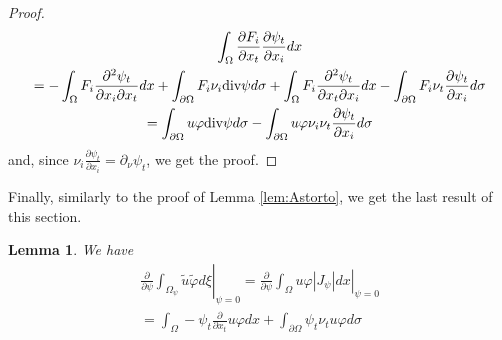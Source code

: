 \documentclass[a4paper,reqno,11pt,oneside]{amsart}
\theoremstyle{plain}
\theoremstyle{plain}
\newtheorem{lem}[thm]{Lemma}
\theoremstyle{plain}
\theoremstyle{remark}
\newtheorem{rem}[thm]{Remark}
\def\div{\textup{div}}
\begin{document}
\begin{proof}
\begin{multline}
        \int_\Omega \frac{\partial  F_i }{\partial x_t}\frac{\partial \psi_t}{\partial x_i}dx\\
        =
        -\int_\Omega F_i   \frac{\partial^2 \psi_t}{\partial x_i\partial x_t}dx
        +\int_{\partial\Omega} F_i\nu_i \div \psi d\sigma
        +\int_\Omega  F_i \frac{\partial^2 \psi_t}{ \partial x_t\partial x_i}dx
      -  \int_{\partial \Omega } F_i \nu_t\frac{\partial \psi_t}{\partial x_i}d\sigma\\
      =\int_{\partial\Omega} u\varphi \div \psi d\sigma
      -  \int_{\partial \Omega } u\varphi \nu_i \nu_t\frac{\partial \psi_t}{\partial x_i}d\sigma
\end{multline}
and, since $\nu_i \frac{\partial \psi_t}{\partial x_i}=\partial_\nu \psi_t$, we get the proof.

\end{proof} 
Finally, similarly to the proof of Lemma \ref{lem:Astorto}, we get the last result of this section. 
\begin{lem}\label{lem:uv}
 We have 
\begin{multline*}
\left. \frac{\partial}{\partial \psi}\int_{ \Omega_\psi} \tilde u\tilde \varphi d\xi\right|_{\psi=0}=
\left. \frac{\partial}{\partial \psi}\int_{ \Omega} u\varphi |J_\psi|dx\right|_{\psi=0}
\\=\int_\Omega-\psi_t \frac{\partial}{\partial x_t}  u \varphi  dx
+\int_{\partial\Omega}\psi_t \nu_t  u \varphi d\sigma
 \end{multline*}
\end{lem}



\end{document}
